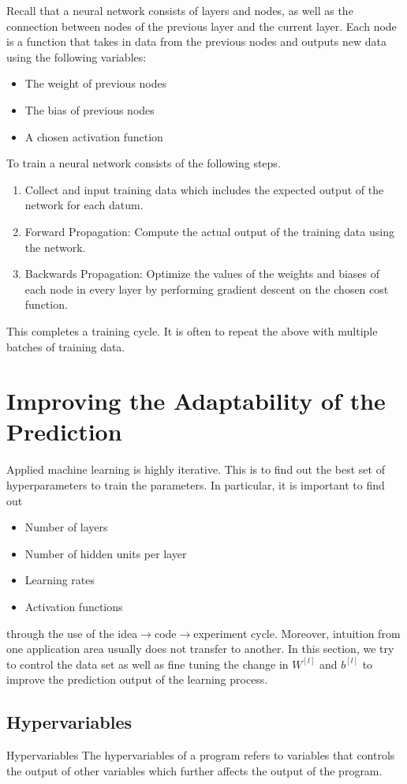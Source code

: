 \documentclass[a4paper]{article}
\begin{document}
\begin{enumerate}
Recall that a neural network consists of layers and nodes, as well as the connection between nodes of the previous layer and the current layer. Each node is a function that takes in data from the previous nodes and outputs new data using the following variables: 
\begin{itemize}
\item The weight of previous nodes
\item The bias of previous nodes
\item A chosen activation function
\end{itemize}
To train a neural network consists of the following steps. 
\begin{enumerate}
\item Collect and input training data which includes the expected output of the network for each datum. 
\item Forward Propagation: Compute the actual output of the training data using the network. 
\item Backwards Propagation: Optimize the values of the weights and biases of each node in every layer by performing gradient descent on the chosen cost function. 
\end{enumerate}

This completes a training cycle. It is often to repeat the above with multiple batches of training data. 

\pagebreak
\section{Improving the Adaptability of the Prediction}
Applied machine learning is highly iterative. This is to find out the best set of hyperparameters to train the parameters. In particular, it is important to find out 
\begin{itemize}
\item Number of layers
\item Number of hidden units per layer
\item Learning rates
\item Activation functions
\end{itemize}
through the use of the idea$\to$code$\to$experiment cycle. Moreover, intuition from one application area usually does not transfer to another. In this section, we try to control the data set as well as fine tuning the change in $W^{[l]}$ and $b^{[l]}$ to improve the prediction output of the learning process. 

\subsection{Hypervariables}
\begin{defn}{Hypervariables}{} The hypervariables of a program refers to variables that controls the output of other variables which further affects the output of the program. 
\end{defn}


\end{enumerate}
\end{document}
